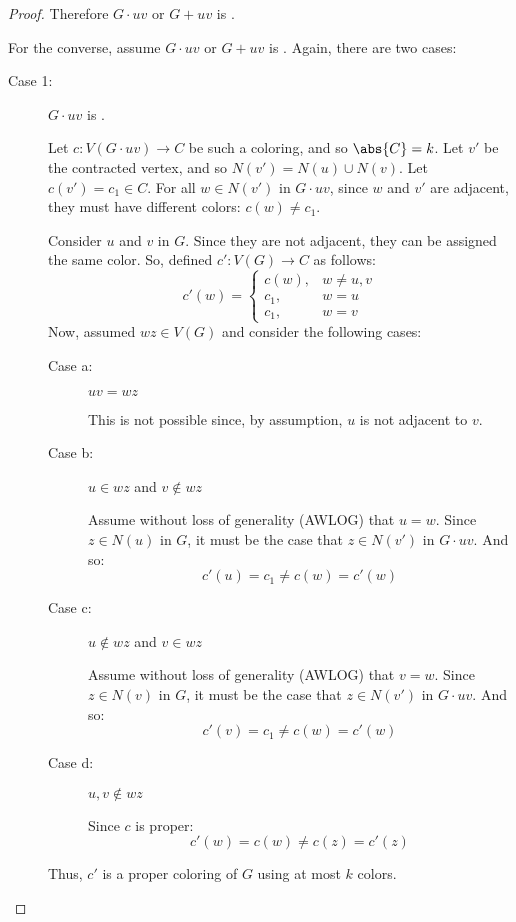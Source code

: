 \begin{proof}
  Therefore \(G\cdot uv\) or \(G+uv\) is .
    
  For the converse, assume \(G\cdot uv\) or \(G+uv\) is .  Again, there are two cases:
  \begin{description}
  \item [Case 1:] \(G\cdot uv\) is .

    Let \(c:V(G\cdot uv)\to C\) be such a coloring, and so \(\abs{C}=k\).  Let \(v'\) be the contracted vertex, and
    so \(N(v')=N(u)\cup N(v)\).  Let \(c(v')=c_1\in C\).  For all \(w\in N(v')\) in \(G\cdot uv\), since \(w\) and
    \(v'\) are adjacent, they must have different colors: \(c(w)\ne c_1\).

    Consider \(u\) and \(v\) in \(G\).  Since they are not adjacent, they can be assigned the same color.  So,
    defined \(c':V(G)\to C\) as follows:
    \[c'(w)=\begin{cases}
    c(w), & w\ne u,v \\
    c_1, & w=u \\
    c_1, & w=v
    \end{cases}\]
    Now, assumed \(wz\in V(G)\) and consider the following cases:
    \begin{description}
    \item[Case a:] \(uv=wz\)

      This is not possible since, by assumption, \(u\) is not adjacent to \(v\).

    \item[Case b:] \(u\in wz\) and \(v\notin wz\)

      Assume without loss of generality (AWLOG) that \(u=w\).  Since \(z\in N(u)\) in \(G\), it must be the case that
      \(z\in N(v')\) in \(G\cdot uv\).  And so:
      \[c'(u)=c_1\ne c(w)=c'(w)\]

    \item[Case c:] \(u\notin wz\) and \(v\in wz\)

      Assume without loss of generality (AWLOG) that \(v=w\).  Since \(z\in N(v)\) in \(G\), it must be the case that
      \(z\in N(v')\) in \(G\cdot uv\).  And so:
      \[c'(v)=c_1\ne c(w)=c'(w)\]

    \item[Case d:] \(u,v\notin wz\)

      Since \(c\) is proper:
      \[c'(w)=c(w)\ne c(z)=c'(z)\]
    \end{description}

    Thus, \(c'\) is a proper coloring of \(G\) using at most \(k\) colors.


\end{description}
\end{proof}
